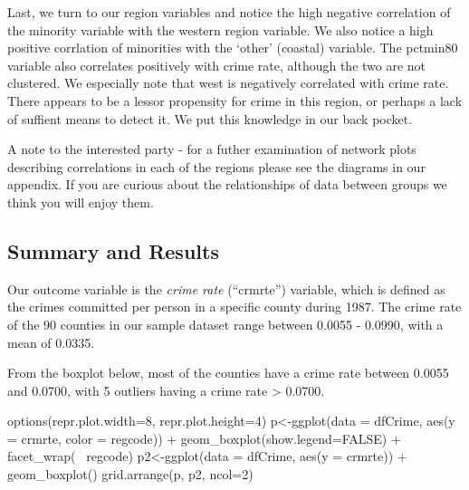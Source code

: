 \documentclass[]{article}
\newenvironment{Shaded}{}{}
\newcommand{\DataTypeTok}[1]{#1}
\newcommand{\DecValTok}[1]{#1}
\newcommand{\KeywordTok}[1]{\textcolor[rgb]{0.00,0.00,1.00}{#1}}
\newcommand{\NormalTok}[1]{#1}
\newcommand{\OperatorTok}[1]{#1}
\newcommand{\OtherTok}[1]{\textcolor[rgb]{1.00,0.25,0.00}{#1}}
\newcommand{\StringTok}[1]{\textcolor[rgb]{0.00,0.50,0.50}{#1}}
\begin{document}
Last, we turn to our region variables and notice the high negative
correlation of the minority variable with the western region variable.
We also notice a high positive corrlation of minorities with the `other'
(coastal) variable. The pctmin80 variable also correlates positively
with crime rate, although the two are not clustered. We especially note
that west is negatively correlated with crime rate. There appears to be
a lessor propensity for crime in this region, or perhaps a lack of
suffient means to detect it. We put this knowledge in our back pocket.

A note to the interested party - for a futher examination of network
plots describing correlations in each of the regions please see the
diagrams in our appendix. If you are curious about the relationships of
data between groups we think you will enjoy them.

\hypertarget{summary-and-results}{%
\subsection{Summary and Results}\label{summary-and-results}}

Our outcome variable is the \emph{crime rate} (``crmrte'') variable,
which is defined as the crimes committed per person in a specific county
during 1987. The crime rate of the 90 counties in our sample dataset
range between 0.0055 - 0.0990, with a mean of 0.0335.

From the boxplot below, most of the counties have a crime rate between
0.0055 and 0.0700, with 5 outliers having a crime rate \textgreater{}
0.0700.

\begin{Shaded}
\begin{Highlighting}[]
\KeywordTok{options}\NormalTok{(}\DataTypeTok{repr.plot.width=}\DecValTok{8}\NormalTok{, }\DataTypeTok{repr.plot.height=}\DecValTok{4}\NormalTok{)}
\NormalTok{p<-}\KeywordTok{ggplot}\NormalTok{(}\DataTypeTok{data =}\NormalTok{ dfCrime, }\KeywordTok{aes}\NormalTok{(}\DataTypeTok{y =}\NormalTok{ crmrte, }\DataTypeTok{color =}\NormalTok{ regcode)) }\OperatorTok{+}
\StringTok{     }\KeywordTok{geom_boxplot}\NormalTok{(}\DataTypeTok{show.legend=}\OtherTok{FALSE}\NormalTok{) }\OperatorTok{+}\StringTok{ }\KeywordTok{facet_wrap}\NormalTok{(}\OperatorTok{~}\StringTok{ }\NormalTok{regcode)}
\NormalTok{p2<-}\KeywordTok{ggplot}\NormalTok{(}\DataTypeTok{data =}\NormalTok{ dfCrime, }\KeywordTok{aes}\NormalTok{(}\DataTypeTok{y =}\NormalTok{ crmrte)) }\OperatorTok{+}
\StringTok{     }\KeywordTok{geom_boxplot}\NormalTok{()}
\KeywordTok{grid.arrange}\NormalTok{(p, p2, }\DataTypeTok{ncol=}\DecValTok{2}\NormalTok{)}
\end{Highlighting}
\end{Shaded}
\end{document}
